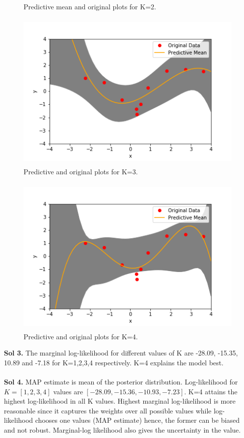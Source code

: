 \documentclass[a4paper,11pt]{article}
\begin{document}
\begin{pmisolution}
\begin{figure}[h]
\caption{Predictive mean and original plots for K=2.}
\end{figure}
\begin{figure}[h]
\centering
\includegraphics[height=3.1in]{question_6b_3.png}
\caption{Predictive and original plots for K=3.}
\end{figure}
\begin{figure}[h]
\centering
\includegraphics[height=3.1in]{question_6b_4.png}
\caption{ Predictive and original plots for K=4.}
\end{figure}
\clearpage
\newpage
\textbf{Sol 3.} The marginal log-likelihood for different values of K are -28.09, -15.35, 10.89 and -7.18 for K=1,2,3,4 respectively. K=4 explains the model best.\\
\\
\break
\textbf{Sol 4.} MAP estimate is mean of the posterior distribution. Log-likelihood for \(K = [1,2,3,4]\) values are \([-28.09,-15.36,-10.93,-7.23]\). K=4 attains the highest log-likelihood in all K values. Highest marginal log-likelihood is more reasonable since it captures the weights over all possible values while log-likelihood chooses one values (MAP estimate) hence, the former can be biased and not robust. Marginal-log likelihood also gives the uncertainty in the value. \\

\end{pmisolution}
\end{document}
